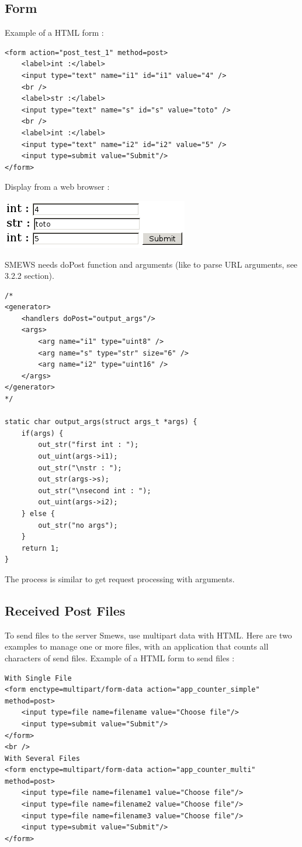 \documentclass{report}
\begin{document}
\subsection{Form}
Example of a HTML form :

\begin{lstlisting}
<form action="post_test_1" method=post>
	<label>int :</label>
	<input type="text" name="i1" id="i1" value="4" />
	<br />
	<label>str :</label>
	<input type="text" name="s" id="s" value="toto" />
	<br />
	<label>int :</label>
	<input type="text" name="i2" id="i2" value="5" />
	<input type=submit value="Submit"/> 
</form>
\end{lstlisting}

Display from a web browser :
\begin{center}
\includegraphics{form}
\end{center}

SMEWS needs doPost function and arguments (like to parse URL arguments, see 3.2.2 section).

\lstset{language=C}
\begin{lstlisting}
/*
<generator>
    <handlers doPost="output_args"/>
    <args>
        <arg name="i1" type="uint8" />
        <arg name="s" type="str" size="6" />
        <arg name="i2" type="uint16" />
    </args>
</generator>
*/

static char output_args(struct args_t *args) {
    if(args) {
        out_str("first int : ");
        out_uint(args->i1);
        out_str("\nstr : ");
        out_str(args->s);
        out_str("\nsecond int : ");
        out_uint(args->i2);
    } else {
        out_str("no args");
    }
    return 1;
}
\end{lstlisting}
The process is similar to get request processing with arguments.

\subsection{Received Post Files}
To send files to the server Smews, use multipart data with HTML. Here are two examples to manage one or more files, with an application that counts all characters of send files.
\newline
\newline
Example of a HTML form to send files :
\begin{lstlisting}
With Single File
<form enctype=multipart/form-data action="app_counter_simple" method=post>
	<input type=file name=filename value="Choose file"/>
	<input type=submit value="Submit"/>
</form>	
<br />
With Several Files
<form enctype=multipart/form-data action="app_counter_multi" method=post>
	<input type=file name=filename1 value="Choose file"/>
	<input type=file name=filename2 value="Choose file"/>
	<input type=file name=filename3 value="Choose file"/>
	<input type=submit value="Submit"/>
</form>
\end{lstlisting}
\end{document}
